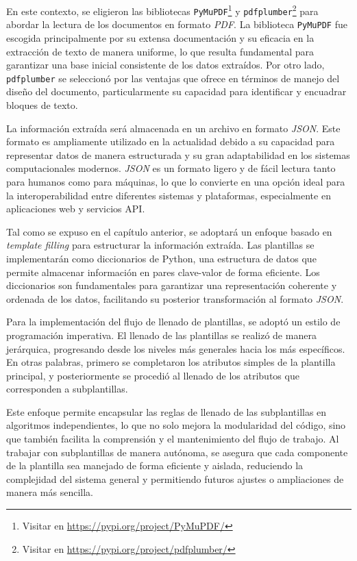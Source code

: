 En este contexto, se eligieron las bibliotecas 
\texttt{PyMuPDF}\footnote{Visitar en \url{https://pypi.org/project/PyMuPDF/}} y 
\texttt{pdfplumber}\footnote{Visitar en \url{https://pypi.org/project/pdfplumber/}} para 
abordar la lectura de los documentos en formato \textit{PDF}. La biblioteca \texttt{PyMuPDF} 
fue escogida principalmente por su extensa documentación y su eficacia en la extracción de 
texto de manera uniforme, lo que resulta fundamental para garantizar una base inicial 
consistente de los datos extraídos. Por otro lado, \texttt{pdfplumber} se seleccionó por las 
ventajas que ofrece en términos de manejo del diseño del documento, particularmente su 
capacidad para identificar y encuadrar bloques de texto.

La información extraída será almacenada en un archivo en formato \textit{JSON}. Este formato 
es ampliamente utilizado en la actualidad debido a su capacidad para representar datos de 
manera estructurada y su gran adaptabilidad en los sistemas computacionales modernos. 
\textit{JSON} es un formato ligero y de fácil lectura tanto para humanos como para máquinas, 
lo que lo convierte en una opción ideal para la interoperabilidad entre diferentes sistemas 
y plataformas, especialmente en aplicaciones web y servicios API.

Tal como se expuso en el capítulo anterior, se adoptará un enfoque basado en \textit{template filling} 
para estructurar la información extraída. Las plantillas se implementarán como diccionarios de Python, 
una estructura de datos que permite almacenar información en pares clave-valor de forma eficiente. 
Los diccionarios son fundamentales para garantizar una representación coherente y ordenada de los datos, 
facilitando su posterior transformación al formato \textit{JSON}.

Para la implementación del flujo de llenado de plantillas, se adoptó un estilo de programación imperativa. 
El llenado de las plantillas 
se realizó de manera jerárquica, progresando desde los niveles más generales hacia los más específicos. 
En otras palabras, primero se completaron los atributos simples de la plantilla principal, y posteriormente 
se procedió al llenado de los atributos que corresponden a subplantillas.

Este enfoque permite encapsular las reglas de llenado de las subplantillas en algoritmos independientes, 
lo que no solo mejora la modularidad del código, sino que también facilita la comprensión y el mantenimiento 
del flujo de trabajo. Al trabajar con subplantillas de manera autónoma, se asegura que cada componente de la 
plantilla sea manejado de forma eficiente y aislada, reduciendo la complejidad del sistema general y permitiendo 
futuros ajustes o ampliaciones de manera más sencilla.

